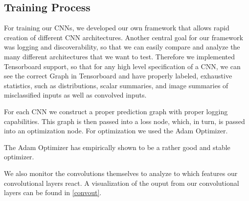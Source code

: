 \documentclass{article}
\begin{document}
\subsection{Training Process}

For training our CNNs, we developed our own framework that allows rapid creation of different CNN architectures. Another central goal for our framework was logging and discoverability, so that we can easily compare and analyze the many different architectures that we want to test. Therefore we implemented Tensorboard support, so that for any high level specification of a CNN, we can see the correct Graph in Tensorboard and have properly labeled, exhaustive statistics, such as distributions, scalar summaries, and image summaries of misclassified inputs as well as convolved inputs.

For each CNN we construct a proper prediction graph with proper logging capabilities. This graph is then passed into a loss node, which, in turn, is passed into an optimization node. For optimization we used the Adam Optimizer.

The Adam Optimizer has empirically shown to be a rather good and stable optimizer. 

We also monitor the convolutions themselves to analyze to which features our convolutional layers react. A visualization of the ouput from our convolutional layers can be found in \ref{convout}.
\end{document}
